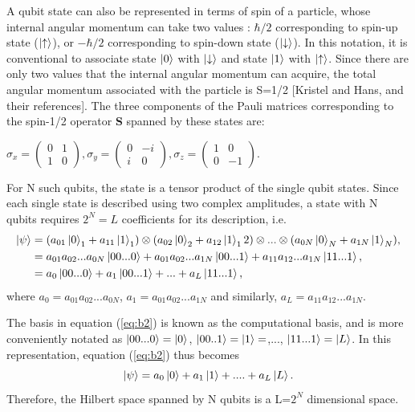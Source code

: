 \documentclass[12]{article}
\begin{document}
A qubit state can also be represented in terms of spin of a particle, whose internal angular momentum can take two values : $\hbar/2$ corresponding to spin-up state ($\ket{\uparrow}$), or $-\hbar/2$ corresponding to spin-down state ($\ket{\downarrow}$). In this notation, it is conventional to associate state $\ket{0}$ with $\ket{\downarrow}$ and state $\ket{1}$ with $\ket{\uparrow}$. Since there are only two values that the internal angular momentum can acquire, the total angular momentum associated with the particle is S=1/2 [Kristel and Hans, and their references]. The three components of the Pauli matrices corresponding to the spin-1/2 operator \textbf{S} spanned by these states are:
\begin{center}
$ \sigma_x= \begin{pmatrix}
0 & 1\\
1 & 0
\end{pmatrix}, \sigma_y= \begin{pmatrix}
0 & -i\\
i & 0
\end{pmatrix}, \sigma_z= \begin{pmatrix}
1 & 0\\
0 & -1
\end{pmatrix}.
$\\
\end{center}
For N such qubits, the state is a tensor product of the single qubit states. Since each single state is described using two complex amplitudes, a state with N qubits requires $2^N=L$ coefficients for its description, i.e. 
\begin{equation}
\begin{split}
\ket{\psi} &= (a_{01}\ket{0}_1+a_{11}\ket{1}_1)\otimes(a_{02}\ket{0}_2+a_{12}\ket{1}_12)\otimes...\otimes(a_{0N}\ket{0}_N+a_{1N}\ket{1}_N),\\ 
		  &=a_{01}a_{02}...a_{0N}\ket{00...0}+a_{01}a_{02}...a_{1N}\ket{00...1}+a_{11}a_{12}...a_{1N}\ket{11...1},\\
		  &=a_0 \ket{00...0}+a_1 \ket{00...1}+...+a_L \ket{11...1},\\ \label{eq:b2}
\end{split}
\end{equation}
where $a_0=a_{01}a_{02}...a_{0N}$, $a_1=a_{01}a_{02}...a_{1N}$ and similarly, $a_L=a_{11}a_{12}...a_{1N}$.

The basis in equation (\ref{eq:b2}) is known as the computational basis, and is more conveniently notated as $\ket{00...0}=\ket{0}$, $\ket{00..1}=\ket{1}=$,..., $\ket{11...1}=\ket{L}$. In this representation, equation (\ref{eq:b2}) thus becomes
\begin{equation}
\ket{\psi}= a_0\ket{0}+a_1\ket{1}+....+a_L\ket{L}.  \label{eq:b3}
\end{equation}
Therefore, the Hilbert space spanned by N qubits is a L=$2^N$ dimensional space.
\end{document}
